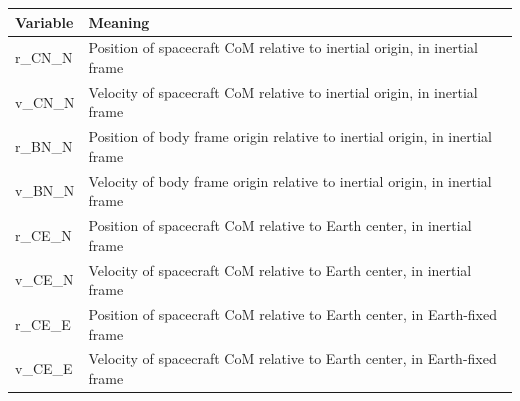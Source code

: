\begin{tabular}{ll}
	\toprule
	Variable & Meaning \\
	\midrule
	r\_CN\_N & Position of spacecraft CoM relative to inertial origin, in inertial frame \\
	v\_CN\_N & Velocity of spacecraft CoM relative to inertial origin, in inertial frame \\
	r\_BN\_N & Position of body frame origin relative to inertial origin, in inertial frame \\
	v\_BN\_N & Velocity of body frame origin relative to inertial origin, in inertial frame \\
	r\_CE\_N & Position of spacecraft CoM relative to Earth center, in inertial frame \\
	v\_CE\_N & Velocity of spacecraft CoM relative to Earth center, in inertial frame \\
	r\_CE\_E & Position of spacecraft CoM relative to Earth center, in Earth-fixed frame \\
	v\_CE\_E & Velocity of spacecraft CoM relative to Earth center, in Earth-fixed frame \\
	\bottomrule
\end{tabular}
